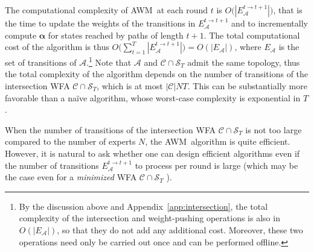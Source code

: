 \documentclass{article}
\newcommand{\sA}{\mathscr A}
\newcommand{\sC}{\mathscr C}
\newcommand{\sS}{\mathscr S}
\newcommand{\balpha}{{\boldsymbol \alpha}}
\newcommand{\cO}{O}
\newcommand{\AWM}{\textsc{AWM}}
\begin{document}
The computational complexity of \AWM\ at each round $t$ is
$\cO\big(|E_{\sA}^{t \to t + 1}|\big)$, that is the time to update the
weights of the transitions in $E_{\sA}^{t \to t + 1}$ and to
incrementally compute $\balpha$ for states reached by paths of length
$t + 1$. The total computational cost of the algorithm is thus
$\cO\big (\sum_{t = 1}^T |E_{\sA}^{t \to t + 1}| \big) =
\cO(|E_\sA|)$, where $E_\sA$ is the set of transitions of
$\sA$.\footnote{By the discussion above and
  Appendix~\ref{app:intersection}, the total complexity of the
  intersection and weight-pushing operations is also in
  $\cO(|E_\sA|)$, so that they do not add any additional
  cost. Moreover, these two operations need only be carried out once
  and can be performed offline.}  Note that $\sA$ and $\sC \cap \sS_T$
admit the same topology, thus the total complexity of the algorithm
depends on the number of transitions of the intersection WFA
$\sC \cap \sS_T$, which is at most $|\sC| NT$. This can be
substantially more favorable than a na\"{i}ve algorithm, whose
worst-case complexity is exponential in $T$.

When the number of transitions of the intersection WFA
$\sC \cap \sS_T$ is not too large compared to the number of experts
$N$, the \AWM\ algorithm is quite efficient.  However, it is natural
to ask whether one can design efficient algorithms even if the number
of transitions $E_{\sA}^{t \to t + 1}$ to process per round is large
(which may be the case even for a \emph{minimized} WFA
$\sC \cap \sS_T$ \citep{Mohri2009}).


\end{document}
